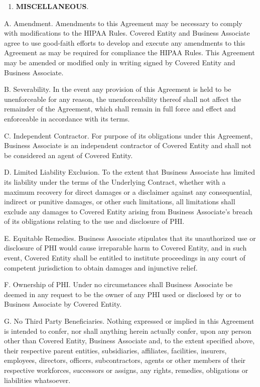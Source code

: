 \documentclass[11pt,a4paper]{article} %
\providecommand{\tightlist}{%
  \setlength{\itemsep}{0pt}\setlength{\parskip}{0pt}}
\begin{document}
\begin{enumerate}
\def\labelenumi{\Roman{enumi}.}
\setcounter{enumi}{3}
\tightlist
\item
  \textbf{MISCELLANEOUS}.
\end{enumerate}

A. Amendment. Amendments to this Agreement may be necessary to comply
with modifications to the HIPAA Rules. Covered Entity and Business
Associate agree to use good-faith efforts to develop and execute any
amendments to this Agreement as may be required for compliance the HIPAA
Rules. This Agreement may be amended or modified only in writing signed
by Covered Entity and Business Associate.

B. Severability. In the event any provision of this Agreement is held to
be unenforceable for any reason, the unenforceability thereof shall not
affect the remainder of the Agreement, which shall remain in full force
and effect and enforceable in accordance with its terms.

C. Independent Contractor. For purpose of its obligations under this
Agreement, Business Associate is an independent contractor of Covered
Entity and shall not be considered an agent of Covered Entity.

D. Limited Liability Exclusion. To the extent that Business Associate
has limited its liability under the terms of the Underlying Contract,
whether with a maximum recovery for direct damages or a disclaimer
against any consequential, indirect or punitive damages, or other such
limitations, all limitations shall exclude any damages to Covered Entity
arising from Business Associate's breach of its obligations relating to
the use and disclosure of PHI.

E. Equitable Remedies. Business Associate stipulates that its
unauthorized use or disclosure of PHI would cause irreparable harm to
Covered Entity, and in such event, Covered Entity shall be entitled to
institute proceedings in any court of competent jurisdiction to obtain
damages and injunctive relief.

F. Ownership of PHI. Under no circumstances shall Business Associate be
deemed in any request to be the owner of any PHI used or disclosed by or
to Business Associate by Covered Entity.

G. No Third Party Beneficiaries. Nothing expressed or implied in this
Agreement is intended to confer, nor shall anything herein actually
confer, upon any person other than Covered Entity, Business Associate
and, to the extent specified above, their respective parent entities,
subsidiaries, affiliates, facilities, insurers, employees, directors,
officers, subcontractors, agents or other members of their respective
workforces, successors or assigns, any rights, remedies, obligations or
liabilities whatsoever.
\end{document}
